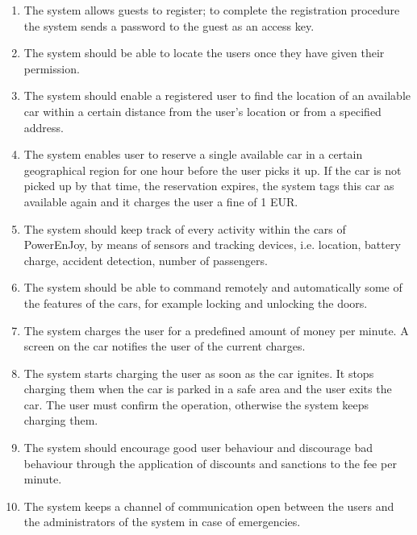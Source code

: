 			
			
			
			\begin{enumerate}
				\item The system allows guests to register; to complete the registration procedure the system sends a password to the guest as an access key.
				\item The system should be able to locate the users once they have given their permission.
				\item The system should enable a registered user to find the location of an available car within a certain distance from the user's location or from a specified address.
				\item The system enables user to reserve a single available car in a certain geographical region for one hour before the user picks it up. If the car is not picked up by that time, the reservation expires, the system tags this car as available again and it charges the user a fine of 1 EUR.
				\item The system should keep track of every activity within the cars of PowerEnJoy, by means of sensors and tracking devices, i.e. location, battery charge, accident detection, number of passengers. 
				\item The system should be able to command remotely and automatically some of the features of the cars, for example locking and unlocking the doors. %
				\item The system charges the user for a predefined amount of money per minute. A screen on the car notifies the user of the current charges.
				\item The system starts charging the user as soon as the car ignites. It stops charging them when the car is parked in a safe area and the user exits the car. The user must confirm the operation, otherwise the system keeps charging them. 
				\item The system should encourage good user behaviour and discourage bad behaviour through the application of discounts and sanctions to the fee per minute. 
				\item The system keeps a channel of communication open between the users and the administrators of the system in case of emergencies. 
			\end{enumerate}						
			
			
			
